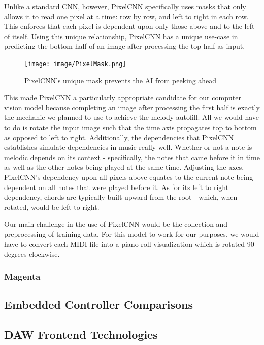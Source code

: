 Unlike a standard CNN, however, PixelCNN specifically uses masks that only allows it to read
one pixel at a time: row by row, and left to right in each row. This enforces that each pixel
is dependent upon only those above and to the left of itself. Using this unique relationship,
PixelCNN has a unique use-case in predicting the bottom half of an image after processing the
top half as input.

\begin{figure}[h!]
  \centering
  \texttt{[image: image/PixelMask.png]}
  \caption{PixelCNN's unique mask prevents the AI from peeking ahead}
  \label{fig:pixel_mask}
\end{figure}

This made PixelCNN a particularly appropriate candidate for our computer vision model because
completing an image after processing the first half is exactly the mechanic we planned to use
to achieve the melody autofill. All we would have to do is rotate the input image such that
the time axis propagates top to bottom as opposed to left to right. Additionally, the
dependencies that PixelCNN establishes simulate dependencies in music really well. Whether or
not a note is melodic depends on its context - specifically, the notes that came before it in
time as well as the other notes being played at the same time. Adjusting the axes, PixelCNN's
dependency upon all pixels above equates to the current note being dependent on all notes
that were played before it. As for its left to right dependency, chords are typically built
upward from the root - which, when rotated, would be left to right.

Our main challenge in the use of PixelCNN would be the collection and preprocessing of
training data. For this model to work for our purposes, we would have to convert each MIDI
file into a piano roll visualization which is rotated 90 degrees clockwise.

\subsubsection{Magenta}

\blindtext

\subsection{Embedded Controller Comparisons}
\label{sec:embedded_controllers}

\blindtext

\subsection{DAW Frontend Technologies}

